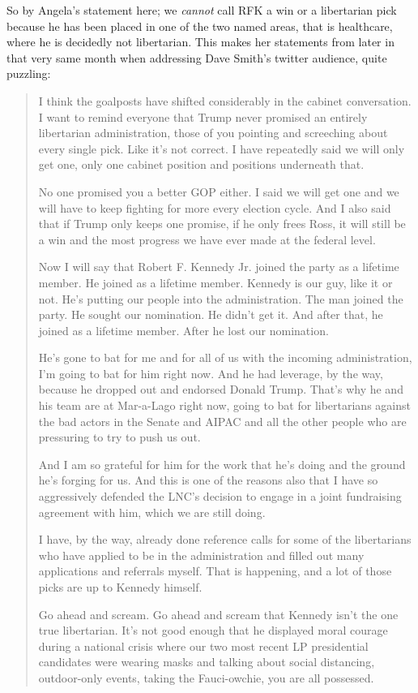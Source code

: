 \documentclass[11pt]{article}
\begin{document}
So by Angela's statement here; we \emph{cannot} call RFK a win or a libertarian pick because he has been placed in one of the two named areas, that is healthcare, where he is decidedly not libertarian. This makes her statements from later in that very same month when addressing Dave Smith's twitter audience, quite puzzling:
\begin{quote}
I think the goalposts have shifted considerably in the cabinet conversation. I want to remind everyone that Trump never promised an entirely libertarian administration, those of you pointing and screeching about every single pick. Like it's not correct. I have repeatedly said we will only get one, only one cabinet position and positions underneath that.

No one promised you a better GOP either. I said we will get one and we will have to keep fighting for more every election cycle. And I also said that if Trump only keeps one promise, if he only frees Ross, it will still be a win and the most progress we have ever made at the federal level.

Now I will say that Robert F. Kennedy Jr. joined the party as a lifetime member. He joined as a lifetime member. Kennedy is our guy, like it or not. He's putting our people into the administration. The man joined the party. He sought our nomination. He didn't get it. And after that, he joined as a lifetime member. After he lost our nomination.

He's gone to bat for me and for all of us with the incoming administration, I'm going to bat for him right now. And he had leverage, by the way, because he dropped out and endorsed Donald Trump. That's why he and his team are at Mar-a-Lago right now, going to bat for libertarians against the bad actors in the Senate and AIPAC and all the other people who are pressuring to try to push us out.

And I am so grateful for him for the work that he's doing and the ground he's forging for us. And this is one of the reasons also that I have so aggressively defended the LNC's decision to engage in a joint fundraising agreement with him, which we are still doing.

I have, by the way, already done reference calls for some of the libertarians who have applied to be in the administration and filled out many applications and referrals myself. That is happening, and a lot of those picks are up to Kennedy himself.

Go ahead and scream. Go ahead and scream that Kennedy isn't the one true libertarian. It's not good enough that he displayed moral courage during a national crisis where our two most recent LP presidential candidates were wearing masks and talking about social distancing, outdoor-only events, taking the Fauci-owchie, you are all possessed.


\end{quote}
\end{document}
